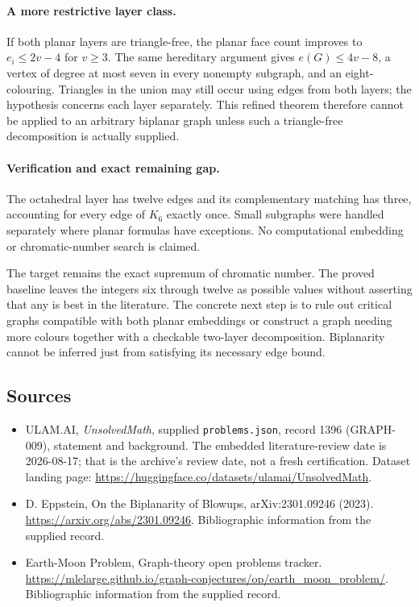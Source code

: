 \documentclass[11pt,a4paper]{article}
\begin{document}
\paragraph{A more restrictive layer class.}
If both planar layers are triangle-free, the planar face count improves to $e_i\le2v-4$ for $v\ge3$. The same hereditary argument gives $e(G)\le4v-8$, a vertex of degree at most seven in every nonempty subgraph, and an eight-colouring. Triangles in the union may still occur using edges from both layers; the hypothesis concerns each layer separately. This refined theorem therefore cannot be applied to an arbitrary biplanar graph unless such a triangle-free decomposition is actually supplied.

\paragraph{Verification and exact remaining gap.}
The octahedral layer has twelve edges and its complementary matching has three, accounting for every edge of $K_6$ exactly once. Small subgraphs were handled separately where planar formulas have exceptions. No computational embedding or chromatic-number search is claimed.

The target remains the exact supremum of chromatic number. The proved baseline leaves the integers six through twelve as possible values without asserting that any is best in the literature. The concrete next step is to rule out critical graphs compatible with both planar embeddings or construct a graph needing more colours together with a checkable two-layer decomposition. Biplanarity cannot be inferred just from satisfying its necessary edge bound.

\subsection{Sources}

{\small

\begin{itemize}

\item[\hypertarget{source:1396:1}{S1}] ULAM.AI, \emph{UnsolvedMath}, supplied \texttt{problems.json}, record 1396 (GRAPH-009), statement and background. The embedded literature-review date is 2026-08-17; that is the archive’s review date, not a fresh certification. Dataset landing page: \url{https://huggingface.co/datasets/ulamai/UnsolvedMath}.

\item[\hypertarget{source:1396:2}{S2}] D. Eppstein, On the Biplanarity of Blowups, arXiv:2301.09246 (2023). \url{https://arxiv.org/abs/2301.09246}. Bibliographic information from the supplied record.

\item[\hypertarget{source:1396:3}{S3}] Earth-Moon Problem, Graph-theory open problems tracker. \url{https://mlelarge.github.io/graph-conjectures/op/earth_moon_problem/}. Bibliographic information from the supplied record.

\end{itemize}

}

\label{end:1396}
\end{document}

